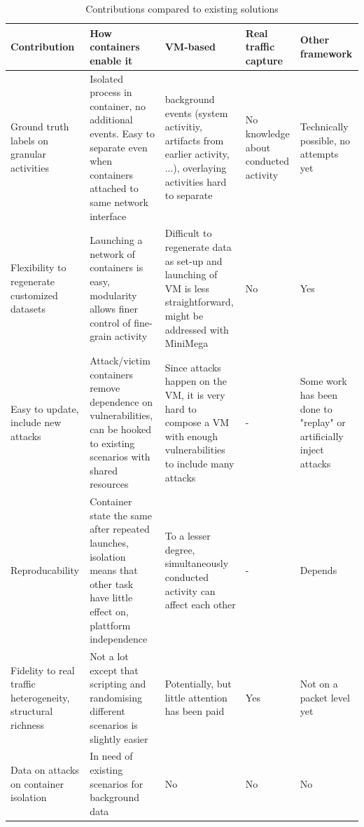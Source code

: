 \documentclass{article}
\begin{document}
\begin{table}
\centering
\begin{tabular}{p{3cm}|p{3cm}|p{3cm}|p{2cm}|p{2cm}}
Contribution&How containers enable it& VM-based & Real traffic capture &Other framework  \\ \hline

Ground truth labels on granular activities & Isolated process in container, no additional events. Easy to separate even when containers attached to same network interface & background events (system activitiy, artifacts from earlier activity, ...), overlaying activities hard to separate & No knowledge about conducted activity & Technically possible, no attempts yet \\ \hline

Flexibility to regenerate customized datasets & Launching a network of containers is easy, modularity allows finer control of fine-grain activity  & Difficult to regenerate data as set-up and launching of VM is less straightforward, might be addressed with MiniMega & No & Yes \\ \hline

Easy to update, include new attacks & 
Attack/victim containers remove dependence on vulnerabilities, can be hooked to existing scenarios with shared resources & Since attacks happen on the VM, it is very hard to compose a VM with enough vulnerabilities to include many attacks & - & Some work has been done to "replay" or artificially inject attacks  \\ \hline

Reproducability & Container state the same after repeated launches, isolation means that other task have little effect on, plattform independence  & To a lesser degree, simultaneously conducted activity can affect each other & - & Depends \\ \hline

Fidelity to real traffic heterogeneity, structural richness & Not a lot except that scripting and randomising different scenarios is slightly easier  & Potentially, but little attention has been paid & Yes & Not on a packet level yet \\ \hline \hline


Data on attacks on container isolation & In need of existing scenarios for background data & No & No & No \\ \hline
\end{tabular}
\caption{Contributions compared to existing solutions}\label{Tab:Contributions}
\end{table}
\end{document}
